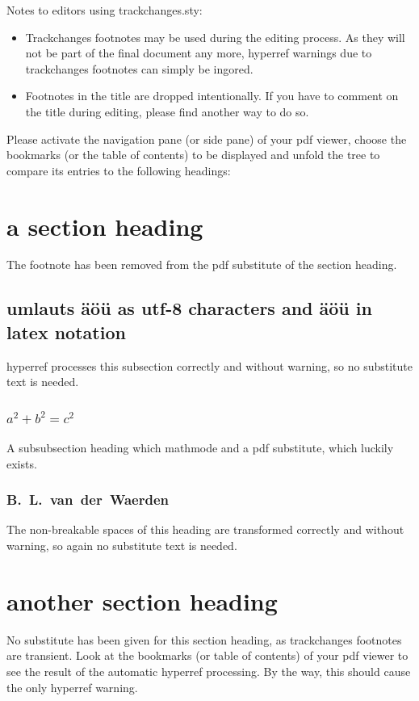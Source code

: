 \documentclass{snapshotmfo}
\begin{document}
\noindent Notes to editors using trackchanges.sty:
\begin{itemize}
  \item Trackchanges footnotes may be used during the editing process. As they will not be part of the final document any more, hyperref warnings due to trackchanges footnotes can simply be ingored.
  \item Footnotes in the title are dropped intentionally. If you have to comment on the title during editing, please find another way to do so.
\end{itemize}

\noindent Please activate the navigation pane (or side pane) of your pdf viewer, choose the bookmarks (or the table of contents) to be displayed and unfold the tree to compare its entries to the following headings:

\section[abbr. section heading]{a section heading
}
The footnote has been removed from the pdf substitute of the section heading.

\subsection{umlauts äöü as utf-8 characters and \"a\"o\"u in latex notation}
hyperref processes this subsection correctly and without warning, so no substitute text is needed.

\subsubsection[a²+b²=c²]{$a^2 + b^2 = c^2$}
A subsubsection heading which mathmode and a pdf substitute, which luckily exists.

\subsubsection{B.~L.~van~der~Waerden}
The non-breakable spaces of this heading are transformed correctly and without warning, so again no substitute text is needed.

\section{another section heading}
No substitute has been given for this section heading, as trackchanges footnotes are transient.
Look at the bookmarks (or table of contents) of your pdf viewer to see the result of the automatic hyperref processing.
By the way, this should cause the only hyperref warning.
\end{document}

